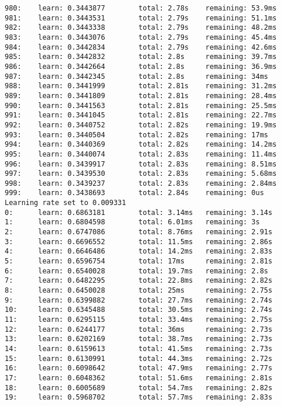 \documentclass[11pt]{article}
\begin{document}
\begin{Verbatim}[commandchars=\\\{\}]
980:    learn: 0.3443877        total: 2.78s    remaining: 53.9ms
981:    learn: 0.3443531        total: 2.79s    remaining: 51.1ms
982:    learn: 0.3443338        total: 2.79s    remaining: 48.2ms
983:    learn: 0.3443076        total: 2.79s    remaining: 45.4ms
984:    learn: 0.3442834        total: 2.79s    remaining: 42.6ms
985:    learn: 0.3442832        total: 2.8s     remaining: 39.7ms
986:    learn: 0.3442664        total: 2.8s     remaining: 36.9ms
987:    learn: 0.3442345        total: 2.8s     remaining: 34ms
988:    learn: 0.3441999        total: 2.81s    remaining: 31.2ms
989:    learn: 0.3441809        total: 2.81s    remaining: 28.4ms
990:    learn: 0.3441563        total: 2.81s    remaining: 25.5ms
991:    learn: 0.3441045        total: 2.81s    remaining: 22.7ms
992:    learn: 0.3440752        total: 2.82s    remaining: 19.9ms
993:    learn: 0.3440504        total: 2.82s    remaining: 17ms
994:    learn: 0.3440369        total: 2.82s    remaining: 14.2ms
995:    learn: 0.3440074        total: 2.83s    remaining: 11.4ms
996:    learn: 0.3439917        total: 2.83s    remaining: 8.51ms
997:    learn: 0.3439530        total: 2.83s    remaining: 5.68ms
998:    learn: 0.3439237        total: 2.83s    remaining: 2.84ms
999:    learn: 0.3438693        total: 2.84s    remaining: 0us
Learning rate set to 0.009331
0:      learn: 0.6863181        total: 3.14ms   remaining: 3.14s
1:      learn: 0.6804598        total: 6.01ms   remaining: 3s
2:      learn: 0.6747086        total: 8.76ms   remaining: 2.91s
3:      learn: 0.6696552        total: 11.5ms   remaining: 2.86s
4:      learn: 0.6646486        total: 14.2ms   remaining: 2.83s
5:      learn: 0.6596754        total: 17ms     remaining: 2.81s
6:      learn: 0.6540028        total: 19.7ms   remaining: 2.8s
7:      learn: 0.6482295        total: 22.8ms   remaining: 2.82s
8:      learn: 0.6450028        total: 25ms     remaining: 2.75s
9:      learn: 0.6399882        total: 27.7ms   remaining: 2.74s
10:     learn: 0.6345488        total: 30.5ms   remaining: 2.74s
11:     learn: 0.6295115        total: 33.4ms   remaining: 2.75s
12:     learn: 0.6244177        total: 36ms     remaining: 2.73s
13:     learn: 0.6202169        total: 38.7ms   remaining: 2.73s
14:     learn: 0.6159613        total: 41.5ms   remaining: 2.73s
15:     learn: 0.6130991        total: 44.3ms   remaining: 2.72s
16:     learn: 0.6098642        total: 47.9ms   remaining: 2.77s
17:     learn: 0.6048362        total: 51.6ms   remaining: 2.81s
18:     learn: 0.6005689        total: 54.7ms   remaining: 2.82s
19:     learn: 0.5968702        total: 57.7ms   remaining: 2.83s

\end{Verbatim}
\end{document}
